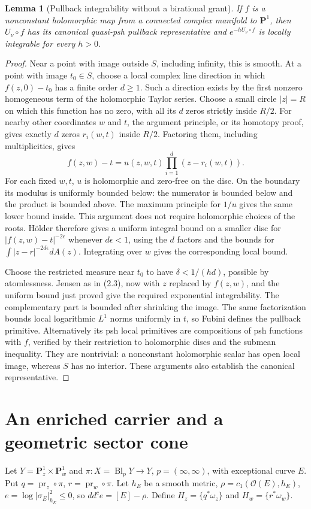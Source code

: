 \documentclass[11pt]{article}
\newtheorem{lemma}[theorem]{Lemma}
\theoremstyle{remark}\newtheorem{remark}[theorem]{Remark}
\newcommand{\ddc}{dd^c}
\newcommand{\PP}{\mathbf P^1}
\begin{document}
\begin{lemma}[Pullback integrability without a birational grant]\label{pulllemma}
If $f$ is a nonconstant holomorphic map from a connected complex
manifold to $\PP$, then $U_\nu\circ f$ has its canonical quasi-psh
pullback representative and $e^{-hU_\nu\circ f}$ is locally
integrable for every $h>0$.
\end{lemma}
\begin{proof}
Near a point with image outside $S$, including infinity, this is
smooth. At a point with image $t_0\in S$, choose a local complex
line direction in which $f(z,0)-t_0$ has a finite order $d\geq1$.
Such a direction exists by the first nonzero homogeneous term of
the holomorphic Taylor series. Choose a small circle $|z|=R$
on which this function has no zero, with all its $d$ zeros
strictly inside $R/2$. For nearby other coordinates $w$ and $t$,
the argument principle, or its homotopy proof, gives exactly $d$
zeros $r_i(w,t)$ inside $R/2$.
Factoring them, including multiplicities, gives
\[
 f(z,w)-t=u(z,w,t)\prod_{i=1}^d(z-r_i(w,t)).
 \tag{2.4}
\]
For each fixed $w,t$, $u$ is holomorphic and zero-free on the disc.
On the boundary its modulus is uniformly bounded below: the numerator
is bounded below and the product is bounded above.
The maximum principle for $1/u$ gives the same lower bound inside.
This argument does not require holomorphic choices of the roots.
H\"older therefore gives a uniform integral bound on a smaller disc
for $|f(z,w)-t|^{-2\epsilon}$ whenever $d\epsilon<1$, using
the $d$ factors and the bounds for
$\int|z-r|^{-2d\epsilon}dA(z)$.
Integrating over $w$ gives the corresponding local bound.

Choose the restricted measure near $t_0$ to have
$\delta<1/(hd)$, possible by atomlessness. Jensen as in (2.3),
now with $z$ replaced by $f(z,w)$, and the uniform bound just proved
give the required exponential integrability.
The complementary part is bounded after shrinking the image.
The same factorization bounds local logarithmic $L^1$ norms
uniformly in $t$, so Fubini defines the pullback primitive.
Alternatively its psh local primitives are compositions of psh
functions with $f$, verified by their restriction to holomorphic
discs and the submean inequality. They are nontrivial: a nonconstant
holomorphic scalar has open local image, whereas $S$ has no interior.
These arguments also establish the canonical representative.
\end{proof}

\section{An enriched carrier and a geometric sector cone}
Let $Y=\PP_z\times\PP_w$ and
$\pi:X=\operatorname{Bl}_{p}Y\to Y$, $p=(\infty,\infty)$,
with exceptional curve $E$. Put
$q=\operatorname{pr}_z\circ\pi$, $r=\operatorname{pr}_w\circ\pi$.
Let $h_E$ be a smooth metric, $\rho=c_1(\mathcal O(E),h_E)$,
$e=\log|\sigma_E|_{h_E}^2\leq0$, so $\ddc e=[E]-\rho$.
Define $H_z=\{q^*\omega_z\}$ and $H_w=\{r^*\omega_w\}$.
\end{document}
